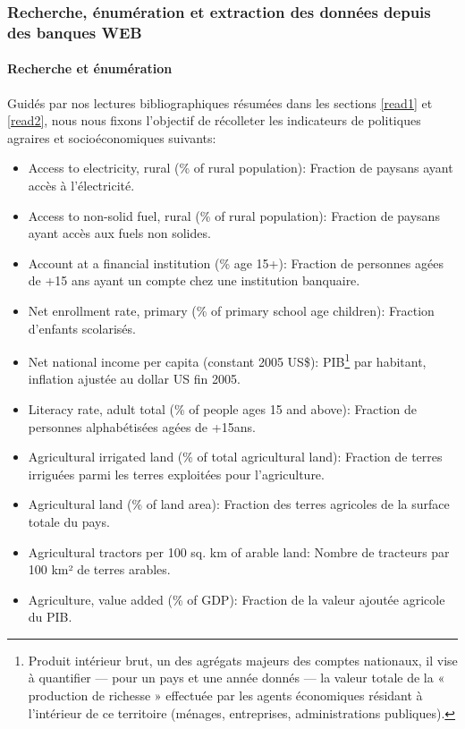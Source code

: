 	\subsubsection{Recherche, énumération et extraction des données depuis des banques WEB}
	\paragraph{Recherche et énumération \newline }
	Guidés par nos lectures bibliographiques résumées dans les sections \ref{read1} et \ref{read2}, nous nous fixons l'objectif de récolleter les indicateurs de politiques agraires et socioéconomiques suivants:
	\begin{itemize}
	\item Access to electricity, rural (\% of rural population): Fraction de paysans ayant accès à l'électricité.
	\item Access to non-solid fuel, rural (\% of rural population): Fraction de paysans ayant accès aux fuels non solides.
	\item Account at a financial institution (\% age 15+): Fraction de personnes agées de +15 ans ayant un compte chez une institution banquaire.
	\item Net enrollment rate, primary (\% of primary school age children): Fraction d'enfants scolarisés.
	\item Net national income per capita (constant 2005 US\$): PIB\footnote{Produit intérieur brut, un des agrégats majeurs des comptes nationaux, il vise à quantifier — pour un pays et une année donnés — la valeur totale de la « production de richesse » effectuée par les agents économiques résidant à l’intérieur de ce territoire (ménages, entreprises, administrations publiques).} par habitant, inflation ajustée au dollar US fin 2005.
	\item Literacy rate, adult total (\% of people ages 15 and above): Fraction de personnes alphabétisées agées de +15ans.
	\item Agricultural irrigated land (\% of total agricultural land): Fraction de terres irriguées parmi les terres exploitées pour l'agriculture.
	\item Agricultural land (\% of land area): Fraction des terres agricoles de la surface totale du pays.
	\item Agricultural tractors per 100 sq. km of arable land: Nombre de tracteurs par 100 km² de terres arables.
	\item Agriculture, value added (\% of GDP): Fraction de la valeur ajoutée agricole du PIB.

\end{itemize}
